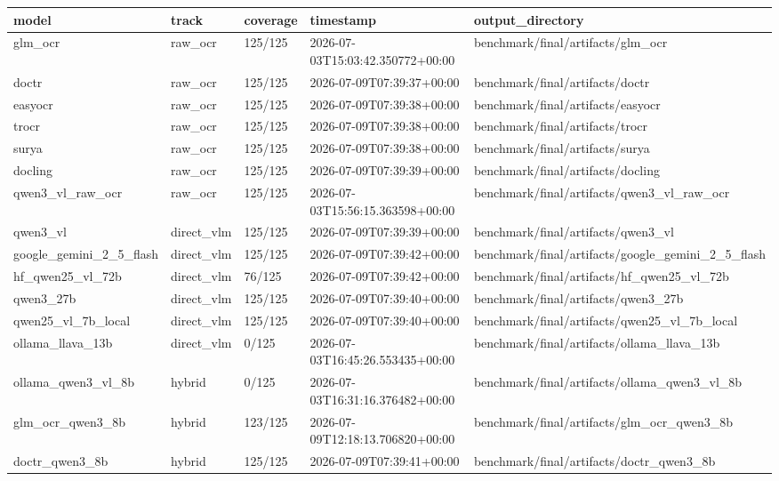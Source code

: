 \begin{tabular}{lllll}
\toprule
model & track & coverage & timestamp & output\_directory \\
\midrule
glm\_ocr & raw\_ocr & 125/125 & 2026-07-03T15:03:42.350772+00:00 & benchmark/final/artifacts/glm\_ocr \\
doctr & raw\_ocr & 125/125 & 2026-07-09T07:39:37+00:00 & benchmark/final/artifacts/doctr \\
easyocr & raw\_ocr & 125/125 & 2026-07-09T07:39:38+00:00 & benchmark/final/artifacts/easyocr \\
trocr & raw\_ocr & 125/125 & 2026-07-09T07:39:38+00:00 & benchmark/final/artifacts/trocr \\
surya & raw\_ocr & 125/125 & 2026-07-09T07:39:38+00:00 & benchmark/final/artifacts/surya \\
docling & raw\_ocr & 125/125 & 2026-07-09T07:39:39+00:00 & benchmark/final/artifacts/docling \\
qwen3\_vl\_raw\_ocr & raw\_ocr & 125/125 & 2026-07-03T15:56:15.363598+00:00 & benchmark/final/artifacts/qwen3\_vl\_raw\_ocr \\
qwen3\_vl & direct\_vlm & 125/125 & 2026-07-09T07:39:39+00:00 & benchmark/final/artifacts/qwen3\_vl \\
google\_gemini\_2\_5\_flash & direct\_vlm & 125/125 & 2026-07-09T07:39:42+00:00 & benchmark/final/artifacts/google\_gemini\_2\_5\_flash \\
hf\_qwen25\_vl\_72b & direct\_vlm & 76/125 & 2026-07-09T07:39:42+00:00 & benchmark/final/artifacts/hf\_qwen25\_vl\_72b \\
qwen3\_27b & direct\_vlm & 125/125 & 2026-07-09T07:39:40+00:00 & benchmark/final/artifacts/qwen3\_27b \\
qwen25\_vl\_7b\_local & direct\_vlm & 125/125 & 2026-07-09T07:39:40+00:00 & benchmark/final/artifacts/qwen25\_vl\_7b\_local \\
ollama\_llava\_13b & direct\_vlm & 0/125 & 2026-07-03T16:45:26.553435+00:00 & benchmark/final/artifacts/ollama\_llava\_13b \\
ollama\_qwen3\_vl\_8b & hybrid & 0/125 & 2026-07-03T16:31:16.376482+00:00 & benchmark/final/artifacts/ollama\_qwen3\_vl\_8b \\
glm\_ocr\_qwen3\_8b & hybrid & 123/125 & 2026-07-09T12:18:13.706820+00:00 & benchmark/final/artifacts/glm\_ocr\_qwen3\_8b \\
doctr\_qwen3\_8b & hybrid & 125/125 & 2026-07-09T07:39:41+00:00 & benchmark/final/artifacts/doctr\_qwen3\_8b \\

\end{tabular}
